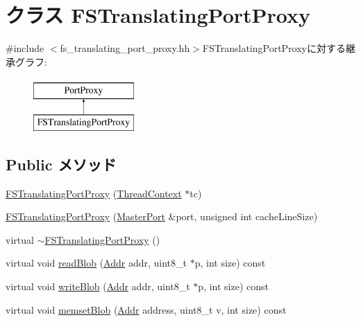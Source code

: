 \hypertarget{classFSTranslatingPortProxy}{
\section{クラス FSTranslatingPortProxy}
\label{classFSTranslatingPortProxy}
}


{\ttfamily \#include $<$fs\_\-translating\_\-port\_\-proxy.hh$>$}FSTranslatingPortProxyに対する継承グラフ:\begin{figure}[H]
\begin{center}
\leavevmode
\includegraphics[height=2cm]{classFSTranslatingPortProxy}
\end{center}
\end{figure}
\subsection*{Public メソッド}
\begin{DoxyCompactItemize}
\item 
\hyperlink{classFSTranslatingPortProxy_aa5819e326f7ee4813d09fb5b5dd663ec}{FSTranslatingPortProxy} (\hyperlink{classThreadContext}{ThreadContext} $\ast$tc)
\item 
\hyperlink{classFSTranslatingPortProxy_a4f36ebf1b0ddd6cf75a1dab0672f0b0e}{FSTranslatingPortProxy} (\hyperlink{classMasterPort}{MasterPort} \&port, unsigned int cacheLineSize)
\item 
virtual \hyperlink{classFSTranslatingPortProxy_ac9bae2fa46b2f91ee55742330aeeee61}{$\sim$FSTranslatingPortProxy} ()
\item 
virtual void \hyperlink{classFSTranslatingPortProxy_a5580fe869fe8ffcffe2660eaa2c6276a}{readBlob} (\hyperlink{base_2types_8hh_af1bb03d6a4ee096394a6749f0a169232}{Addr} addr, uint8\_\-t $\ast$p, int size) const 
\item 
virtual void \hyperlink{classFSTranslatingPortProxy_ad2a72c978fca534c6afc8b0f6ac2fe19}{writeBlob} (\hyperlink{base_2types_8hh_af1bb03d6a4ee096394a6749f0a169232}{Addr} addr, uint8\_\-t $\ast$p, int size) const 
\item 
virtual void \hyperlink{classFSTranslatingPortProxy_aaaf1f49b0b6f48f1af72af03caf7fef7}{memsetBlob} (\hyperlink{base_2types_8hh_af1bb03d6a4ee096394a6749f0a169232}{Addr} address, uint8\_\-t v, int size) const 
\end{DoxyCompactItemize}
